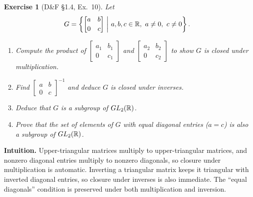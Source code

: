 \documentclass[12pt]{article}
\newtheorem{exercise}[theorem]{Exercise}
\theoremstyle{definition}
\begin{document}
\begin{exercise}[D\&F §1.4, Ex.~10]
Let
\[
G=\left\{\begin{bmatrix}a&b\\[2pt]0&c\end{bmatrix}\ \middle|\ a,b,c\in\Bbb R,\ a\neq0,\ c\neq0\right\}.
\]
\begin{enumerate}
\item[(a)] Compute the product of $\begin{bmatrix}a_1&b_1\\ 0&c_1\end{bmatrix}$ and $\begin{bmatrix}a_2&b_2\\ 0&c_2\end{bmatrix}$ to show $G$ is closed under multiplication.
\item[(b)] Find $\begin{bmatrix}a&b\\ 0&c\end{bmatrix}^{-1}$ and deduce $G$ is closed under inverses.
\item[(c)] Deduce that $G$ is a subgroup of $GL_2(\Bbb R)$.
\item[(d)] Prove that the set of elements of $G$ with equal diagonal entries ($a=c$) is also a subgroup of $GL_2(\Bbb R)$.
\end{enumerate}
\end{exercise}

\dotfill

\noindent\textbf{Intuition.}
Upper-triangular matrices multiply to upper-triangular matrices, and nonzero diagonal entries multiply to nonzero diagonals, so closure under multiplication is automatic. Inverting a triangular matrix keeps it triangular with inverted diagonal entries, so closure under inverses is also immediate. The “equal diagonals” condition is preserved under both multiplication and inversion.

\dotfill
\end{document}
